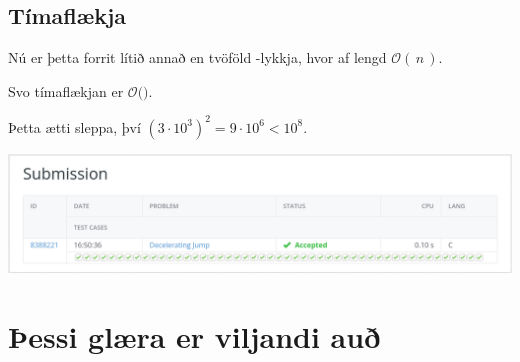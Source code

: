 \subsection{Tímaflækja}
{
    {
        \item<1-> Nú er þetta forrit lítið annað en tvöföld -lykkja, hvor af lengd $\mathcal{O}(\,n\,)$.
        \item<2-> Svo tímaflækjan er $\mathcal{O}($$)$.
        \item<4-> Þetta ætti sleppa, því $(3 \cdot 10^3)^2 = 9 \cdot 10^6 < 10^8$.
        \item<5->[] \includegraphics[scale = 0.25]{fig/ac.png}
    }
}

\section{Þessi glæra er viljandi auð}
{
}


